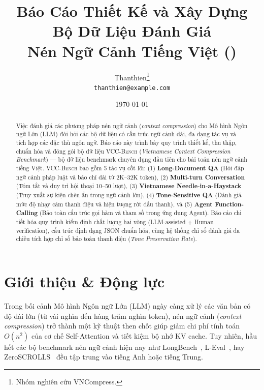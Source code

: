 \documentclass[12pt,a4paper]{article}
\title{\textbf{Báo Cáo Thiết Kế và Xây Dựng Bộ Dữ Liệu Đánh Giá \\
Nén Ngữ Cảnh Tiếng Việt (\method{VCC-Bench})}}
\author{
  Thanthien\thanks{Nhóm nghiên cứu VNCompress.} \\
  \texttt{thanthien@example.com}
}
\date{\today}
\newcommand{\method}[1]{\textsc{#1}}
\begin{document}
\maketitle

\begin{abstract}
Việc đánh giá các phương pháp nén ngữ cảnh (\textit{context compression}) cho Mô hình Ngôn ngữ Lớn (LLM) đòi hỏi các bộ dữ liệu có cấu trúc ngữ cảnh dài, đa dạng tác vụ và tích hợp các đặc thù ngôn ngữ. Báo cáo này trình bày quy trình thiết kế, thu thập, chuẩn hóa và đóng gói bộ dữ liệu \method{VCC-Bench} (\textit{Vietnamese Context Compression Benchmark}) --- bộ dữ liệu benchmark chuyên dụng đầu tiên cho bài toán nén ngữ cảnh tiếng Việt. \method{VCC-Bench} bao gồm 5 tác vụ cốt lõi: (1) \textbf{Long-Document QA} (Hỏi đáp ngữ cảnh pháp luật và báo chí dài từ 2K--32K token), (2) \textbf{Multi-turn Conversation} (Tóm tắt và duy trì hội thoại 10--50 lượt), (3) \textbf{Vietnamese Needle-in-a-Haystack} (Truy xuất sự kiện chèn ẩn trong ngữ cảnh lớn), (4) \textbf{Tone-Sensitive QA} (Đánh giá mức độ nhạy cảm thanh điệu và hiện tượng rớt dấu thanh), và (5) \textbf{Agent Function-Calling} (Bảo toàn cấu trúc gọi hàm và tham số trong ứng dụng Agent). Báo cáo chi tiết hóa quy trình kiểm định chất lượng hai vòng (LLM-assisted + Human verification), cấu trúc định dạng JSON chuẩn hóa, cùng hệ thống chỉ số đánh giá đa chiều tích hợp chỉ số bảo toàn thanh điệu (\textit{Tone Preservation Rate}).
\end{abstract}

\section{Giới thiệu & Động lực}

Trong bối cảnh Mô hình Ngôn ngữ Lớn (LLM) ngày càng xử lý các văn bản có độ dài lớn (từ vài nghìn đến hàng trăm nghìn token), nén ngữ cảnh (\textit{context compression}) trở thành một kỹ thuật then chốt giúp giảm chi phí tính toán $O(n^2)$ của cơ chế Self-Attention và tiết kiệm bộ nhớ KV cache. Tuy nhiên, hầu hết các bộ benchmark nén ngữ cảnh hiện nay như LongBench~\cite{bai2023longbench}, L-Eval~\cite{chen2023leval}, hay ZeroSCROLLS~\cite{shaham2023zeroscrolls} đều tập trung vào tiếng Anh hoặc tiếng Trung.
\end{document}
